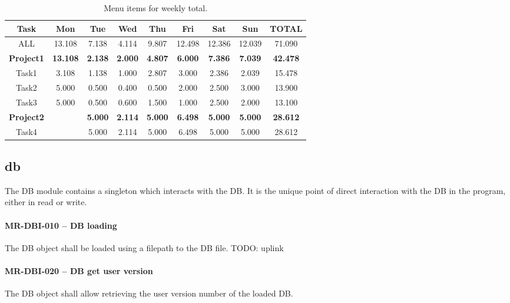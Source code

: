 \begin{table} \caption{\label{tab:weekly_total_menu_items} Menu items for
    weekly total.}
  \begin{tabular}{| c | c | c | c | c | c | c | c | c |} \hline
    Task & Mon & Tue & Wed & Thu & Fri & Sat & Sun & TOTAL \\ \hline
    ALL & 13.108 & 7.138 & 4.114 & 9.807
        & 12.498 & 12.386 & 12.039 & 71.090 \\ \hline
    \textbf{Project1} & \textbf{13.108} & \textbf{2.138} & \textbf{2.000}
                      & \textbf{4.807} & \textbf{6.000} & \textbf{7.386}
                      & \textbf{7.039} & \textbf{42.478} \\ \hline
    Task1 & 3.108 & 1.138 & 1.000
          & 2.807 & 3.000 & 2.386
          & 2.039 & 15.478 \\ \hline
    Task2 & 5.000 & 0.500 & 0.400
          & 0.500 & 2.000 & 2.500
          & 3.000 & 13.900 \\ \hline
    Task3 & 5.000 & 0.500 & 0.600
          & 1.500 & 1.000 & 2.500
          & 2.000 & 13.100 \\ \hline
    \textbf{Project2} & & \textbf{5.000} & \textbf{2.114}
                      & \textbf{5.000} & \textbf{6.498} & \textbf{5.000}
                      & \textbf{5.000} & \textbf{28.612} \\ \hline
    Task4 & & 5.000 & 2.114
          & 5.000 & 6.498 & 5.000
          & 5.000 & 28.612 \\ \hline
  \end{tabular}
\end{table}
\subsection{db}
The DB module contains a singleton which interacts with the \gls{DB}.
It is the unique point of direct interaction with the DB in the program,
either in read or write.

\paragraph{MR-DBI-010 -- DB loading}
The DB object shall be loaded using a filepath to the \gls{DB} file.
TODO: uplink

\paragraph{MR-DBI-020 -- DB get user version}
The DB object shall allow retrieving the user version number of the
loaded DB.

